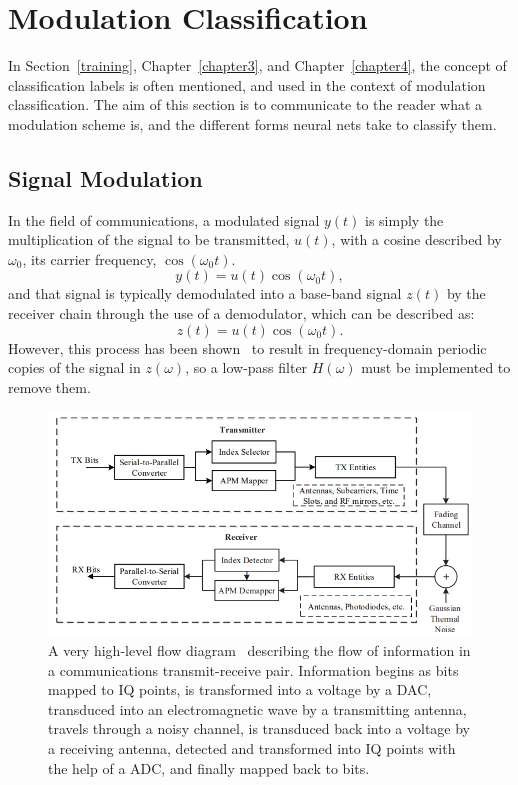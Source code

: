 \section{Modulation Classification}
\label{modclass}
In Section~\ref{training}, Chapter~\ref{chapter3}, and Chapter~\ref{chapter4}, the concept of classification labels is often mentioned, and used in the context of modulation classification. The aim of this section is to communicate to the reader what a modulation scheme is, and the different forms neural nets take to classify them.
\subsection{Signal Modulation}
In the field of communications, a modulated signal $y(t)$ is simply the multiplication of the signal to be transmitted, $u(t)$, with a cosine described by $\omega_0$, its carrier frequency, $\cos(\omega_0 t)$.
\begin{equation}
\label{eq:modulate}
y(t) = u(t) \cos(\omega_0 t),
\end{equation}
and that signal is typically demodulated into a base-band signal $z(t)$ by the receiver chain through the use of a demodulator, which can be described as:
\begin{equation}
\label{eq:demodulate}
z(t) = u(t) \cos(\omega_0 t).
\end{equation}
However, this process has been shown~\cite{pahlavan2005wireless} to result in frequency-domain periodic copies of the signal in $z(\omega)$, so a low-pass filter $H(\omega)$ must be implemented to remove them.

\begin{figure}[ht!]
	\centering	\includegraphics[width=1\textwidth,keepaspectratio]{figs/txrx.png}
    \caption{A very high-level flow diagram~\cite{mods} describing the flow of information in a communications transmit-receive pair. Information begins as bits mapped to IQ points, is transformed into a voltage by a DAC, transduced into an electromagnetic wave by a transmitting antenna, travels through a noisy channel, is transduced back into a voltage by a receiving antenna, detected and transformed into IQ points with the help of a ADC, and finally mapped back to bits.}
\label{fig:txrx}      
\end{figure}


